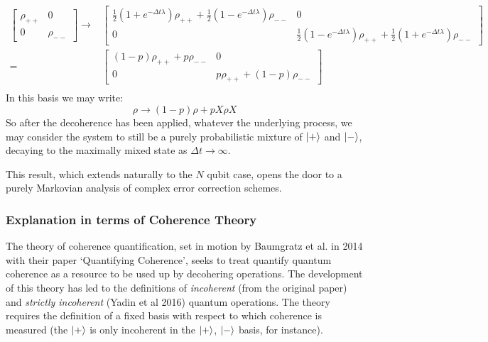 \documentclass{report}
\begin{document}
\begin{appendices}
\begin{align*}
    \begin{bmatrix}
        \rho_{++} & 0\\ 0 & \rho_{--}
    \end{bmatrix}
    \longrightarrow
    &\begin{bmatrix}
        \frac{1}{2}(1+e^{-\Delta t \lambda})\rho_{++} + \frac{1}{2}(1-e^{-\Delta t \lambda})\rho_{--} & 0 \\
        0 & \frac{1}{2}(1-e^{-\Delta t \lambda})\rho_{++} + \frac{1}{2}(1+e^{-\Delta t \lambda})\rho_{--}
    \end{bmatrix}\\
    = &\begin{bmatrix}
        (1-p)\rho_{++} + p\rho_{--} & 0 \\
        0 & p\rho_{++} + (1-p)\rho_{--}
    \end{bmatrix}\\
\end{align*}
In this basis we may write:
\begin{equation*}
    \rho \longrightarrow (1-p)\rho + p X\rho X
\end{equation*}
So after the decoherence has been applied, whatever the underlying process, we may consider the system to still be a purely probabilistic mixture of $\ket{+}$ and $\ket{-}$, decaying to the maximally mixed state as $\Delta t \rightarrow \infty$.

This result, which extends naturally to the $N$ qubit case, opens the door to a purely Markovian analysis of complex error correction schemes.

\subsubsection{Explanation in terms of Coherence Theory}
The theory of coherence quantification, set in motion by Baumgratz et al. in 2014 with their paper `Quantifying Coherence', seeks to treat quantify quantum coherence as a resource to be used up by decohering operations. The development of this theory has led to the definitions of \textit{incoherent} (from the original paper) and \textit{strictly incoherent} (Yadin et al 2016) quantum operations. The theory requires the definition of a fixed basis with respect to which coherence is measured (the $\ket{+}$ is only incoherent in the $\ket{+}$, $\ket{-}$ basis, for instance).


\end{appendices}
\end{document}
